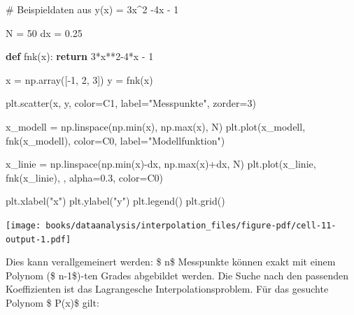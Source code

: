 \documentclass[
  letterpaper,
  DIV=11,
  numbers=noendperiod]{scrreprt}
\newenvironment{Shaded}{\begin{snugshade}}{\end{snugshade}}
\newcommand{\BuiltInTok}[1]{\textcolor[rgb]{0.00,0.23,0.31}{#1}}
\newcommand{\CommentTok}[1]{\textcolor[rgb]{0.37,0.37,0.37}{#1}}
\newcommand{\ControlFlowTok}[1]{\textcolor[rgb]{0.00,0.23,0.31}{\textbf{#1}}}
\newcommand{\DecValTok}[1]{\textcolor[rgb]{0.68,0.00,0.00}{#1}}
\newcommand{\FloatTok}[1]{\textcolor[rgb]{0.68,0.00,0.00}{#1}}
\newcommand{\KeywordTok}[1]{\textcolor[rgb]{0.00,0.23,0.31}{\textbf{#1}}}
\newcommand{\NormalTok}[1]{\textcolor[rgb]{0.00,0.23,0.31}{#1}}
\newcommand{\OperatorTok}[1]{\textcolor[rgb]{0.37,0.37,0.37}{#1}}
\newcommand{\StringTok}[1]{\textcolor[rgb]{0.13,0.47,0.30}{#1}}
\begin{document}
\begin{Shaded}
\begin{Highlighting}[]
\CommentTok{\# Beispieldaten aus y(x) = 3x\^{}2 {-}4x {-} 1}

\NormalTok{N }\OperatorTok{=} \DecValTok{50}
\NormalTok{dx }\OperatorTok{=} \FloatTok{0.25}

\KeywordTok{def}\NormalTok{ fnk(x):}
    \ControlFlowTok{return} \DecValTok{3}\OperatorTok{*}\NormalTok{x}\OperatorTok{**}\DecValTok{2}\OperatorTok{{-}}\DecValTok{4}\OperatorTok{*}\NormalTok{x }\OperatorTok{{-}} \DecValTok{1}

\NormalTok{x }\OperatorTok{=}\NormalTok{ np.array([}\OperatorTok{{-}}\DecValTok{1}\NormalTok{, }\DecValTok{2}\NormalTok{, }\DecValTok{3}\NormalTok{])}
\NormalTok{y }\OperatorTok{=}\NormalTok{ fnk(x)}

\NormalTok{plt.scatter(x, y, color}\OperatorTok{=}\StringTok{\textquotesingle{}C1\textquotesingle{}}\NormalTok{, label}\OperatorTok{=}\StringTok{"Messpunkte"}\NormalTok{, zorder}\OperatorTok{=}\DecValTok{3}\NormalTok{)}

\NormalTok{x\_modell }\OperatorTok{=}\NormalTok{ np.linspace(np.}\BuiltInTok{min}\NormalTok{(x), np.}\BuiltInTok{max}\NormalTok{(x), N)}
\NormalTok{plt.plot(x\_modell, fnk(x\_modell), color}\OperatorTok{=}\StringTok{\textquotesingle{}C0\textquotesingle{}}\NormalTok{, label}\OperatorTok{=}\StringTok{"Modellfunktion"}\NormalTok{)}

\NormalTok{x\_linie }\OperatorTok{=}\NormalTok{ np.linspace(np.}\BuiltInTok{min}\NormalTok{(x)}\OperatorTok{{-}}\NormalTok{dx, np.}\BuiltInTok{max}\NormalTok{(x)}\OperatorTok{+}\NormalTok{dx, N)}
\NormalTok{plt.plot(x\_linie, fnk(x\_linie), }\StringTok{\textquotesingle{}{-}{-}\textquotesingle{}}\NormalTok{, alpha}\OperatorTok{=}\FloatTok{0.3}\NormalTok{, color}\OperatorTok{=}\StringTok{\textquotesingle{}C0\textquotesingle{}}\NormalTok{)}

\NormalTok{plt.xlabel(}\StringTok{"x"}\NormalTok{)}
\NormalTok{plt.ylabel(}\StringTok{"y"}\NormalTok{)}
\NormalTok{plt.legend()}
\NormalTok{plt.grid()}
\end{Highlighting}
\end{Shaded}

\texttt{[image: books/dataanalysis/interpolation\_files/figure-pdf/cell-11-output-1.pdf]}

Dies kann verallgemeinert werden: \$ n\$ Messpunkte können exakt mit
einem Polynom (\$ n-1\$)-ten Grades abgebildet werden. Die Suche nach
den passenden Koeffizienten ist das Lagrangesche Interpolationsproblem.
Für das gesuchte Polynom \$ P(x)\$ gilt:
\end{document}

